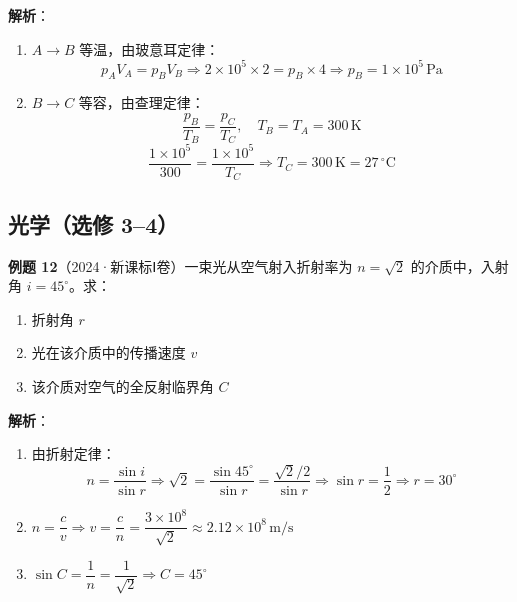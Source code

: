 \textbf{解析}：
\begin{enumerate}
  \item $A\to B$ 等温，由玻意耳定律：
  \[
  p_AV_A = p_BV_B \Rightarrow 2\times10^5 \times 2 = p_B \times 4 \Rightarrow p_B = 1\times10^5\,\text{Pa}
  \]
  \item $B\to C$ 等容，由查理定律：
  \[
  \frac{p_B}{T_B} = \frac{p_C}{T_C},\quad T_B = T_A = 300\,\text{K}
  \]
  \[
  \frac{1\times10^5}{300} = \frac{1\times10^5}{T_C} \Rightarrow T_C = 300\,\text{K} = 27\,^\circ\text{C}
  \]
\end{enumerate}

\subsection{光学（选修 3--4）}

\textbf{例题 12}（2024·新课标Ⅰ卷）一束光从空气射入折射率为 $n = \sqrt{2}$ 的介质中，入射角 $i = 45^\circ$。求：
\begin{enumerate}
  \item 折射角 $r$
  \item 光在该介质中的传播速度 $v$
  \item 该介质对空气的全反射临界角 $C$
\end{enumerate}

\textbf{解析}：
\begin{enumerate}
  \item 由折射定律：
  \[
  n = \frac{\sin i}{\sin r} \Rightarrow \sqrt{2} = \frac{\sin45^\circ}{\sin r} = \frac{\sqrt{2}/2}{\sin r} \Rightarrow \sin r = \frac12 \Rightarrow r = 30^\circ
  \]
  \item $n = \dfrac{c}{v} \Rightarrow v = \dfrac{c}{n} = \dfrac{3\times10^8}{\sqrt{2}} \approx 2.12\times10^8\,\text{m/s}$
  \item $\sin C = \dfrac{1}{n} = \dfrac{1}{\sqrt{2}} \Rightarrow C = 45^\circ$
\end{enumerate}
